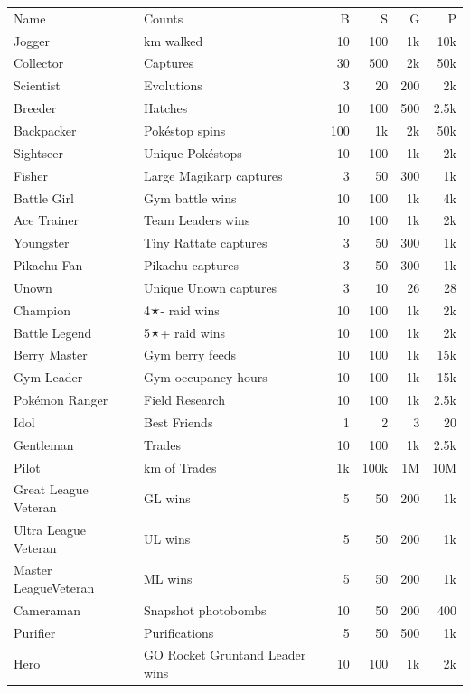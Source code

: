 \begin{longtable}{m{}m{}rrrr}
Name & Counts & B & S & G & P\\
\Midrule
Jogger & km walked & 10 & 100 & 1k & 10k\\
Collector & Captures & 30 & 500 & 2k & 50k\\
Scientist & Evolutions & 3 & 20 & 200 & 2k\\
Breeder & Hatches & 10 & 100 & 500 & 2.5k\\
Backpacker & Pokéstop spins & 100 & 1k & 2k & 50k\\
Sightseer & Unique Pokéstops & 10 & 100 & 1k & 2k\\
Fisher & Large Magikarp captures & 3 & 50 & 300 & 1k\\
Battle Girl & Gym battle wins & 10 & 100 & 1k & 4k\\
Ace Trainer & Team Leaders wins & 10 & 100 & 1k & 2k\\
Youngster & Tiny Rattate captures & 3 & 50 & 300 & 1k\\
Pikachu Fan & Pikachu captures & 3 & 50 & 300 & 1k\\
Unown & Unique Unown captures & 3 & 10 & 26 & 28\\
Champion & 4🟉- raid wins & 10 & 100 & 1k & 2k\\
Battle Legend & 5🟉+ raid wins & 10 & 100 & 1k & 2k\\
Berry Master & Gym berry feeds & 10 & 100 & 1k & 15k\\
Gym Leader & Gym occupancy hours & 10 & 100 & 1k & 15k\\
Pokémon Ranger & Field Research & 10 & 100 & 1k & 2.5k\\
Idol & Best Friends & 1 & 2 & 3 & 20\\
Gentleman & Trades & 10 & 100 & 1k & 2.5k\\
Pilot & km of Trades & 1k & 100k & 1M & 10M\\
Great League Veteran & GL wins & 5 & 50 & 200 & 1k\\
Ultra League Veteran & UL wins & 5 & 50 & 200 & 1k\\
Master League\newline{}Veteran & ML wins & 5 & 50 & 200 & 1k\\
Cameraman & Snapshot photobombs & 10 & 50 & 200 & 400\\
Purifier & Purifications & 5 & 50 & 500 & 1k\\
Hero & GO Rocket Grunt\newline{}and Leader wins & 10 & 100 & 1k & 2k\\

\end{longtable}
